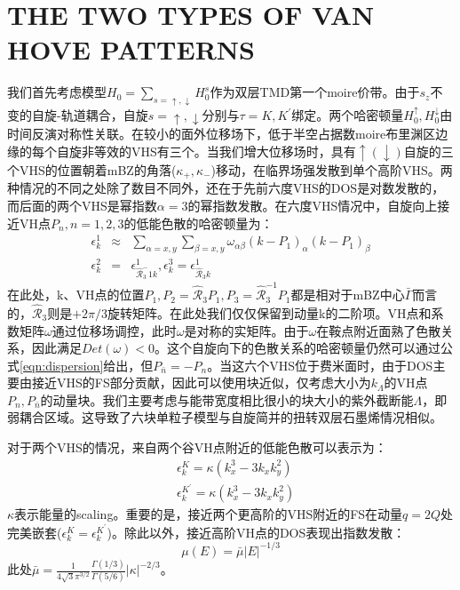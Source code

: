 \documentclass[reprint, aps, prb, showkeys]{revtex4-2}
\begin{document}
\section{THE TWO TYPES OF VAN HOVE PATTERNS}
我们首先考虑模型$H_0 = \sum_{s = \uparrow, \downarrow} H_0^s$作为双层TMD第一个moire价带。由于$s_z$不变的自旋-轨道耦合，自旋$s = \uparrow, \downarrow$分别与$\tau = K, K^{'}$绑定。两个哈密顿量$H_0^{\uparrow}, H_0^{\downarrow}$由时间反演对称性关联。在较小的面外位移场下，低于半空占据数moire布里渊区边缘的每个自旋非等效的VHS有三个。当我们增大位移场时，具有$\uparrow(\downarrow)$自旋的三个VHS的位置朝着mBZ的角落($\kappa_{+}, \kappa_{-}$)移动，在临界场强发散到单个高阶VHS。两种情况的不同之处除了数目不同外，还在于先前六度VHS的DOS是对数发散的，而后面的两个VHS是幂指数$\alpha = 3$的幂指数发散。在六度VHS情况中，自旋向上接近VH点$P_n, n=1, 2, 3$的低能色散的哈密顿量为：
\begin{eqnarray}
    \epsilon_k^1 &\approx& \sum_{\alpha = x, y} \sum_{\beta = x, y} \omega_{\alpha\beta}(k - P_1)_{\alpha}(k - P_1)_{\beta} \nonumber \\
    \epsilon_k^2 &=& \epsilon_{\hat{\mathcal{R}}_3^-1 k }^1, \epsilon_k^3 = \epsilon_{\hat{\mathcal{R}}_3 k }^1 \label{eqn:dispersion}
\end{eqnarray}
在此处，k、VH点的位置$P_1, P_2 = \hat{\mathcal{R}}_3 P_1, P_3 = \hat{\mathcal{R}}_3^{-1} P_1$都是相对于mBZ中心$\bar{\Gamma}$而言的，$\hat{\mathcal{R}}_3$则是$+2\pi/3$旋转矩阵。在此处我们仅仅保留到动量k的二阶项。VH点和系数矩阵$\omega$通过位移场调控，此时$\omega$是对称的实矩阵。由于$\omega$在鞍点附近面熟了色散关系，因此满足$Det(\omega)<0$。这个自旋向下的色散关系的哈密顿量仍然可以通过公式\ref{eqn:dispersion}给出，但$P_{\bar{n}} = -P_n$。当这六个VHS位于费米面时，由于DOS主要由接近VHS的FS部分贡献，因此可以使用块近似，仅考虑大小为$k_{\Lambda }$的VH点$P_n, P_{\bar{n}}$的动量块。我们主要考虑与能带宽度相比很小的块大小的紫外截断能$\Lambda$，即弱耦合区域。这导致了六块单粒子模型与自旋简并的扭转双层石墨烯情况相似。

对于两个VHS的情况，来自两个谷VH点附近的低能色散可以表示为：
\begin{eqnarray}
    &\epsilon_k^K = \kappa(k_x^3 - 3k_xk_y^2) \nonumber \\
    &\epsilon_k^{K^{'}} = \kappa(k_x^3 - 3k_x k_y^2) \label{eqn:TwoVHS_dispersion}
\end{eqnarray}
$\kappa$表示能量的scaling。重要的是，接近两个更高阶的VHS附近的FS在动量$q = 2Q$处完美嵌套($\epsilon_k^K = \epsilon_k^{K^{'}}$)。除此以外，接近高阶VH点的DOS表现出指数发散：
\begin{equation}
    \mu(E) = \bar{\mu} | E |^{-1/3}
\end{equation}
此处$\bar{\mu} = \frac{1}{4\sqrt{3} \pi^{3/2}} \frac{\Gamma(1/3)}{\Gamma(5/6)} | \kappa |^{-2/3}$。
\end{document}
